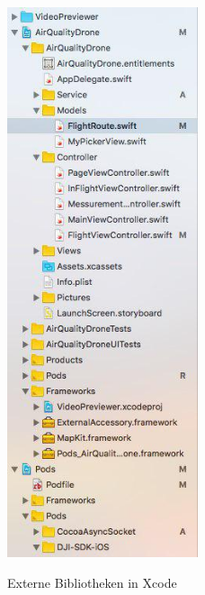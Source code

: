 \begin{figure}[H]
	\begin{center}
		{\includegraphics[width=0.5\textwidth]{images/pods.jpg}}
		\caption{Externe Bibliotheken in Xcode \cite{Cocoa.Bild}}
	\end{center}
\end{figure}

